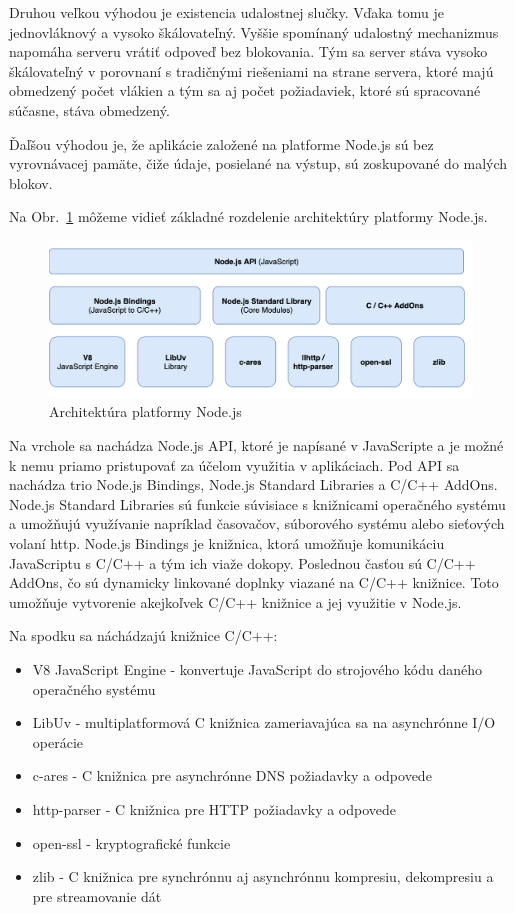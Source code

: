 \indent Druhou veľkou výhodou je existencia udalostnej slučky. Vďaka tomu je jednovláknový a vysoko škálovateľný. Vyššie spomínaný udalostný mechanizmus napomáha serveru vrátiť odpoveď bez blokovania. Tým sa server stáva vysoko škálovateľný v porovnaní s tradičnými riešeniami na strane servera, ktoré majú obmedzený počet vlákien a tým sa aj počet požiadaviek, ktoré sú spracované súčasne, stáva obmedzený. 

\indent Ďaľšou výhodou je, že aplikácie založené na platforme Node.js sú bez vyrovnávacej pamäte, čiže údaje, posielané na výstup, sú zoskupované do malých blokov.

\indent Na Obr.~\ref{fig:node_arch} môžeme vidieť základné rozdelenie architektúry platformy Node.js. 

\begin{figure}[H]
    \centering
    \includegraphics[scale=0.30]{img/node_architecture.png}
    \caption{Architektúra platformy Node.js}
    \label{fig:node_arch}
\end{figure}

\indent Na vrchole sa nachádza Node.js API, ktoré je napísané v JavaScripte a je možné k nemu priamo pristupovať za účelom využitia v aplikáciach. Pod API sa nachádza trio Node.js Bindings, Node.js Standard Libraries a C/C++ AddOns. Node.js Standard Libraries sú funkcie súvisiace s knižnicami operačného systému a umožňujú využívanie napríklad časovačov, súborového systému alebo sieťových volaní http. Node.js Bindings je knižnica, ktorá umožňuje komunikáciu JavaScriptu s C/C++ a tým ich viaže dokopy. Poslednou časťou sú C/C++ AddOns, čo sú dynamicky linkované doplnky viazané na C/C++ knižnice. Toto umožňuje vytvorenie akejkoľvek C/C++ knižnice a jej využitie v Node.js. 

\indent Na spodku sa náchádzajú knižnice C/C++:
\begin{itemize}
    \item V8 JavaScript Engine - konvertuje JavaScript do strojového kódu daného operačného systému
    \item LibUv - multiplatformová C knižnica zameriavajúca sa na asynchrónne I/O operácie
    \item c-ares - C knižnica pre asynchrónne DNS požiadavky a odpovede
    \item http-parser - C knižnica pre HTTP požiadavky a odpovede
    \item open-ssl - kryptografické funkcie
    \item zlib - C knižnica pre synchrónnu aj asynchrónnu kompresiu, dekompresiu a pre streamovanie dát 
\end{itemize}

